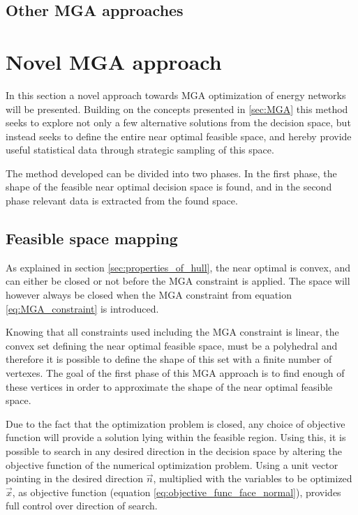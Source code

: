 \subsection{Other MGA approaches}



\section{Novel MGA approach}\label{sec:Novel_MGA}

In this section a novel approach towards MGA optimization of energy networks will be presented. Building on the concepts presented in \ref{sec:MGA} this method seeks to explore not only a few alternative solutions from the decision space, but instead seeks to define the entire near optimal feasible space, and hereby provide useful statistical data through strategic sampling of this space. 

The method developed can be divided into two phases. In the first phase, the shape of the feasible near optimal decision space is found, and in the second phase relevant data is extracted from the found space. 

\subsection{Feasible space mapping}
As explained in section \vref{sec:properties_of_hull}, the near optimal is convex, and can either be closed or not before the MGA constraint is applied. The space will however always be closed when the MGA constraint from equation \vref{eq:MGA_constraint} is introduced.

Knowing that all constraints used including the MGA constraint is linear, the convex set defining the near optimal feasible space, must be a polyhedral and therefore it is possible to define the shape of this set with a finite number of vertexes. The goal of the first phase of this MGA approach is to find enough of these vertices in order to approximate the shape of the near optimal feasible space. 

Due to the fact that the optimization problem is closed, any choice of objective function will provide a solution lying within the feasible region. Using this, it is possible to search in any desired direction in the decision space by altering the objective function of the numerical optimization problem. Using a unit vector pointing in the desired direction $\vec{n}$, multiplied with the variables to be optimized $\vec{x}$, as objective function (equation \ref{eq:objective_func_face_normal}), provides full control over direction of search. 

